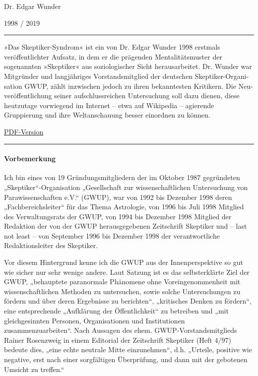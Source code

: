Dr. Edgar Wunder

1998 / 2019

\begin{center}\rule{0.5\linewidth}{\linethickness}\end{center}

»Das Skeptiker-Syndrom« ist ein von Dr. Edgar Wunder 1998 erstmals
veröffentlichter Aufsatz, in dem er die prägenden Mentalitätsmuster der
sogenannten »Skeptiker« aus soziologischer Sicht heraus­ar­beitet. Dr.
Wunder war Mitgründer und langjähriges Vorstandsmitglied der deutschen
Skeptiker-Orga­ni­sation GWUP, zählt inzwischen jedoch zu ihren
bekanntesten Kritikern. Die Neu­ver­öffent­lichung seiner
aufschluss­reichen Untersuchung soll dazu dienen, diese heutzutage
vorwiegend im Internet -- etwa auf Wikipedia -- agierende Gruppierung
und ihre Weltanschauung besser einordnen zu können.

\href{https://swprs.files.wordpress.com/2019/09/das-skeptiker-syndrom.pdf}{PDF-Version}

\begin{center}\rule{0.5\linewidth}{\linethickness}\end{center}

\hypertarget{vorbemerkung}{%
\paragraph{Vorbemerkung}\label{vorbemerkung}}

Ich bin eines von 19 Gründungsmitgliedern der im Oktober 1987
gegründeten „Skeptiker``-Organisation „Gesellschaft zur
wissenschaftlichen Untersuchung von Parawissenschaften e.V.`` (GWUP),
war von 1992 bis Dezember 1998 deren „Fachbereichsleiter`` für das Thema
Astrologie, von 1996 bis Juli 1998 Mitglied des Verwaltungsrats der
GWUP, von 1994 bis Dezember 1998 Mitglied der Redaktion der von der GWUP
herausgegebenen Zeitschrift Skeptiker und -- last not least -- von
September 1996 bis Dezember 1998 der verantwortliche Redaktionsleiter
des Skeptiker.

Vor diesem Hintergrund kenne ich die GWUP aus der Innenperspektive so
gut wie sicher nur sehr wenige andere. Laut Satzung ist es das
selbsterklärte Ziel der GWUP, „behauptete paranormale Phänomene ohne
Voreingenommenheit mit wissenschaftlichen Methoden zu untersuchen, sowie
solche Untersuchungen zu fördern und über deren Ergebnisse zu
berichten``, „kritisches Denken zu fördern``, eine entsprechende
„Aufklärung der Öffentlichkeit`` zu betreiben und „mit gleichgesinnten
Personen, Organisationen und Institutionen zusammenzuarbeiten``. Nach
Aussagen des ehem. GWUP-Vorstandsmitglieds Rainer Rosenzweig in einem
Editorial der Zeitschrift Skeptiker (Heft 4/97) bedeute dies, „eine
echte neutrale Mitte einzunehmen``, d.h. „Urteile, positive wie
negative, erst nach einer sorgfältigen Überprüfung, und dann mit der
gebotenen Umsicht zu treffen.``

